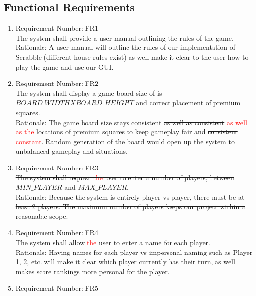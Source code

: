 \documentclass[12pt, titlepage]{article}
\begin{document}
\subsection{Functional Requirements}

\begin{enumerate} %
    \item 
    \sout{Requirement Number: FR1} \\ %
    \sout{The system shall provide a user manual outlining the rules of the game. \\
    Rationale: A user manual will outline the rules of our implementation of Scrabble (different house rules exist) as well make it clear to the user how to play the game and use our GUI.}\\
    \item 
    Requirement Number: FR2 \\ %
    The system shall display a game board size of is $BOARD\_WIDTHXBOARD\_HEIGHT$ and correct placement of premium squares. \\
    Rationale: The game board size stays consistent \sout{ as well as consistent} \textcolor{red}{as well as the} locations of premium squares to keep gameplay fair and \sout{consistent} \textcolor{red}{constant}. Random generation of the board would open up the system to unbalanced gameplay and situations.\\
    \item 
    \sout{Requirement Number: FR3} \\ %
    \sout{The system shall request \textcolor{red}{the} user to enter a number of players, between $MIN\_PLAYER$ and $MAX\_PLAYER$. \\
    Rationale: Because the system is entirely player vs player, there must be at least 2 players. The maximum number of players keeps our project within a reasonable scope.} \\
    \item
    Requirement Number: FR4 \\ %
    The system shall allow \textcolor{red}{the} user to enter a name for each player. \\
    Rationale: Having names for each player vs impersonal naming such as Player 1, 2, etc. will make it clear which player currently has their turn, as well makes score rankings more personal for the player.\\
    \item 
    Requirement Number: FR5 \\ %

\end{enumerate}
\end{document}
